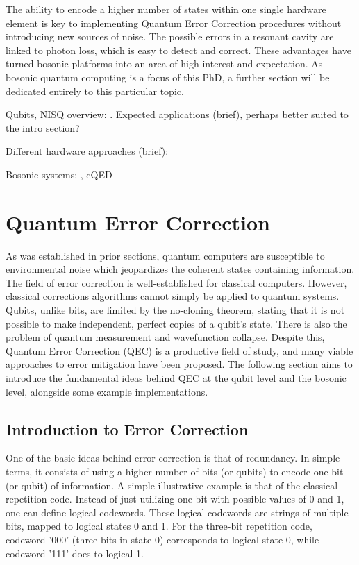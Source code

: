 The ability to encode a higher number of states within one single hardware element is key to implementing Quantum Error Correction procedures without introducing new sources of noise. The possible errors in a resonant cavity are linked to photon loss, which is easy to detect and correct. These advantages have turned bosonic platforms into an area of high interest and expectation. As bosonic quantum computing is a focus of this PhD, a further section will be dedicated entirely to this particular topic.





\vspace{5cm}
Qubits, NISQ overview: \cite{Nielsen2010} \cite{Preskill2018} \cite{IBMintro} \cite{Kaye2007} \cite{Cleve2021}. 
Expected applications (brief), perhaps better suited to the intro section?

Different hardware approaches (brief): \cite{Dwave} \cite{Zurich} \cite{IBMtec}

Bosonic systems: \cite{Zurich} \cite{Girvin2021}, cQED

\clearpage
\chapter{Quantum Error Correction}

As was established in prior sections, quantum computers are susceptible to environmental noise which jeopardizes the coherent states containing information. The field of error correction is well-established for classical computers. However, classical corrections algorithms cannot simply be applied to quantum systems. Qubits, unlike bits, are limited by the no-cloning theorem, stating that it is not possible to make independent, perfect copies of a qubit's state. There is also the problem of quantum measurement and wavefunction collapse. Despite this, Quantum Error Correction (QEC) is a productive field of study, and many viable approaches to error mitigation have been proposed. The following section aims to introduce the fundamental ideas behind QEC at the qubit level and the bosonic level, alongside some example implementations.

\section{Introduction to Error Correction}

One of the basic ideas behind error correction is that of redundancy. In simple terms, it consists of using a higher number of bits (or qubits) to encode one bit (or qubit) of information. A simple illustrative example is that of the classical repetition code. Instead of just utilizing one bit with possible values of 0 and 1, one can define logical codewords. These logical codewords are strings of multiple bits, mapped to logical states 0 and 1. For the three-bit repetition code, codeword '000' (three bits in state 0) corresponds to logical state 0, while codeword '111' does to logical 1. 

